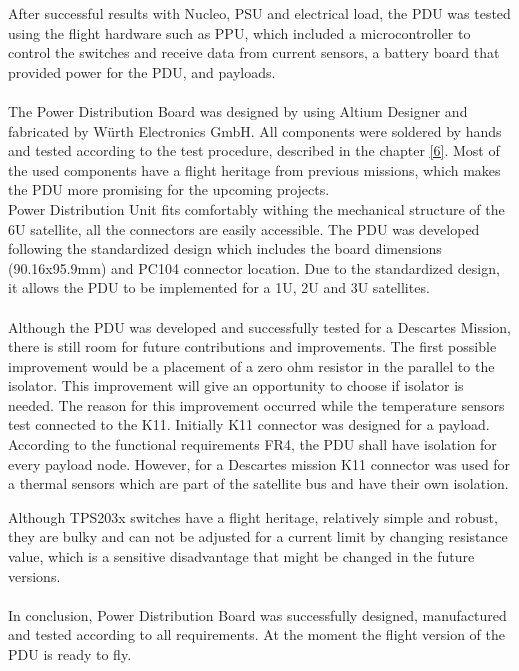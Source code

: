 After successful results with Nucleo, PSU and electrical load, the PDU was tested using the flight hardware such as PPU, which included a microcontroller to control the switches and receive data from current sensors, a battery board that provided power for the PDU, and payloads. 
\\ \\
The Power Distribution Board was designed by using Altium Designer and fabricated by Würth Electronics GmbH. All components were soldered by hands and tested according to the test procedure, described in the chapter \ref{6}. Most of the used components have a flight heritage from previous missions, which makes the PDU more promising for the upcoming projects.  \\ 
Power Distribution Unit fits comfortably withing the mechanical structure of the 6U satellite, all the connectors are easily accessible. The
PDU was developed following the standardized design which includes the board dimensions (90.16x95.9mm) and PC104 connector location.
Due to the standardized design, it allows the PDU to be implemented for a 1U, 2U and 3U satellites. \\ \\
Although the PDU was developed and successfully tested for a Descartes Mission, there is still room for future contributions and improvements. The first possible improvement would be a placement of a zero ohm resistor in the parallel to the isolator. This improvement will give an opportunity to choose if isolator is needed. The reason for this improvement occurred while the temperature sensors test connected to the K11. Initially K11 connector was designed for a payload. According to the functional requirements FR4, the PDU shall have isolation for every payload node. However, for a Descartes mission K11 connector was used for a thermal sensors which are part of the satellite bus and have their own isolation.

 Although TPS203x switches have a flight heritage, relatively simple and robust, they are bulky and can not be adjusted for a current limit by changing resistance value, which is a sensitive disadvantage that might be changed in the future versions.  \\ \\
In conclusion, Power Distribution Board was successfully designed,  manufactured and tested according to all requirements. At the moment the flight version of the PDU is ready to fly. 
